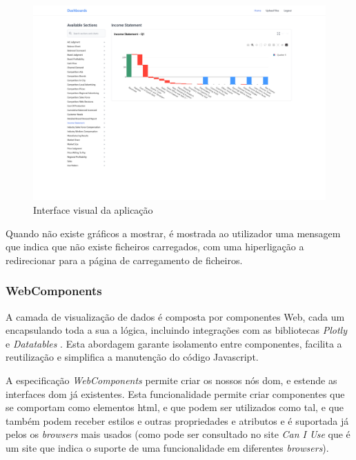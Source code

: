 \begin{figure}[H]
    \centering
    \includegraphics[width=\textwidth]{./img/res_1920}
 \caption{Interface visual da aplicação}
 \end{figure}


 Quando não existe gráficos a mostrar, é mostrada ao utilizador uma mensagem que indica que não existe ficheiros carregados, com uma hiperligação a redirecionar para a página de carregamento de ficheiros.

\subsubsection{WebComponents}

A camada de visualização de dados é composta por componentes Web, cada um encapsulando toda a sua a lógica, incluindo integrações com as bibliotecas \textit{Plotly} e \textit{Datatables} . Esta abordagem garante isolamento entre componentes, facilita a reutilização e simplifica a manutenção do código Javascript. 

A especificação \textit{WebComponents}\cite{webcomponents} permite criar os nossos nós \gls{dom}, e estende as interfaces \gls{dom} já existentes. Esta funcionalidade permite criar componentes que se comportam como elementos \gls{html}, e que podem ser utilizados como tal, e que também podem receber estilos e outras propriedades e atributos e é suportada já pelos os \textit{browsers} mais usados (como pode ser consultado no site \textit{Can I Use}\cite{caniuse} que é um site que indica o suporte de uma funcionalidade em diferentes \textit{browsers}).

